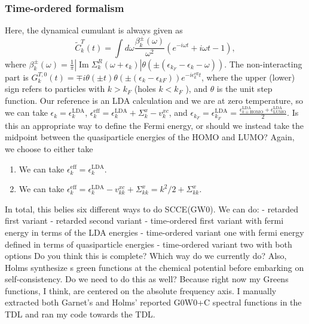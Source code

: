 \subsubsection{Time-ordered formalism}
Here, the dynamical cumulant is always given as
\begin{equation}
    \tilde{C}_k^T(t) = \int d\omega \frac{\beta_k^{ \pm}(\omega)}{\omega^2}\left(e^{-i \omega t}+i \omega t-1\right) ,
\end{equation}
where $\beta_k^{ \pm}(\omega)= \frac{1}{\pi}\left|\operatorname{Im} \Sigma_k^R\left(\omega+\epsilon_k\right)\right| \theta\left( \pm\left(\epsilon_{k_F}-\epsilon_k-\omega\right)\right)$. The non-interacting part is $G_k^{T, 0}(t)=\mp i \theta( \pm t) \theta\left( \pm\left(\epsilon_k-\epsilon_{k F}\right)\right) e^{-i \epsilon_k^{\text{eff}} t}$, where the upper (lower) sign refers to particles with $k>k_F$ (holes $k<k_F$ ), and $\theta$ is the unit step function. Our reference is an LDA calculation and we are at zero temperature, so we can take $\epsilon_k=\epsilon_k^{\text{LDA}}$, $\epsilon_k^{\text{eff}}=\epsilon_k^{\text{LDA}}+\Sigma_k^x - v_k^{xc}$, and $\epsilon_{k_F}=\epsilon_{k_F}^{\text{LDA}}=\frac{\epsilon_{k\equiv\text{HOMO}}^{\text{LDA}} + \epsilon_{\text{LUMO}}^{\text{LDA}}}{2}$. Is this an appropriate way to define the Fermi energy, or should we instead take the midpoint between the quasiparticle energies of the HOMO and LUMO? Again, we choose to either take 
\begin{enumerate}
    \item We can take $\epsilon_k^{\text{eff}} = \epsilon_k^{\mathrm{LDA}}$.
    \item We can take $\epsilon_k^{\text{eff}} = \epsilon_k^{\mathrm{LDA}} - v_{kk}^{xc} + \Sigma_{kk}^x = k^2/2 + \Sigma_{kk}^x$.
\end{enumerate}
In total, this belies six different ways to do SCCE(GW0). We can do:
- retarded first variant
- retarded second variant
- time-ordered first variant with fermi energy in terms of the LDA energies
- time-ordered variant one with fermi energy defined in terms of quasiparticle energies
- time-ordered variant two with both options
Do you think this is complete? Which way do we currently do? Also, Holms synthesize
s green functions at the chemical potential before embarking on self-consistency. Do we need to do this as well? Because right now my Greens functions, I think, are centered on the absolute frequency axis. 
I manually extracted both Garnet's and Holms' reported G0W0+C spectral functions in the TDL and ran my code towards the TDL.
